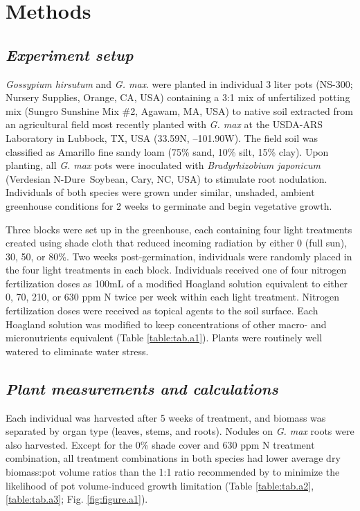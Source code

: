 \section{Methods}
\subsection{\textit{Experiment setup}}
\noindent \textit{Gossypium hirsutum} and \textit{G. max}. were planted in individual 3 liter pots (NS-300; Nursery Supplies, Orange, CA, USA) containing a 3:1 mix of unfertilized potting mix (Sungro Sunshine Mix \#2, Agawam, MA, USA) to native soil extracted from an agricultural field most recently planted with \textit{G. max} at the USDA-ARS Laboratory in Lubbock, TX, USA (33.59\textdegree{}N, –101.90\textdegree{}W). The field soil was classified as Amarillo fine sandy loam (75\% sand, 10\% silt, 15\% clay). Upon planting, all \textit{G. max} pots were inoculated with \textit{Bradyrhizobium japonicum} (Verdesian N-Dure\texttrademark\ Soybean, Cary, NC, USA) to stimulate root nodulation. Individuals of both species were grown under similar, unshaded, ambient greenhouse conditions for 2 weeks to germinate and begin vegetative growth. 

Three blocks were set up in the greenhouse, each containing four light treatments created using shade cloth that reduced incoming radiation by either 0 (full sun), 30, 50, or 80\%. Two weeks post-germination, individuals were randomly placed in the four light treatments in each block. Individuals received one of four nitrogen fertilization doses as 100mL of a modified Hoagland solution  equivalent to either 0, 70, 210, or 630 ppm N twice per week within each light treatment. Nitrogen fertilization doses were received as topical agents to the soil surface. Each Hoagland solution was modified to keep concentrations of other macro- and micronutrients equivalent (Table \ref{table:tab.a1}). Plants were routinely well watered to eliminate water stress.

\subsection{\textit{Plant measurements and calculations}}
\noindent Each individual was harvested after 5 weeks of treatment, and biomass was separated by organ type (leaves, stems, and roots). Nodules on \textit{G. max} roots were also harvested. Except for the 0\% shade cover and 630 ppm N treatment combination, all treatment combinations in both species had lower average dry biomass:pot volume ratios than the 1:1 ratio recommended by  to minimize the likelihood of pot volume-induced growth limitation (Table \ref{table:tab.a2}, \ref{table:tab.a3}; Fig. \ref{fig:figure.a1}). 

